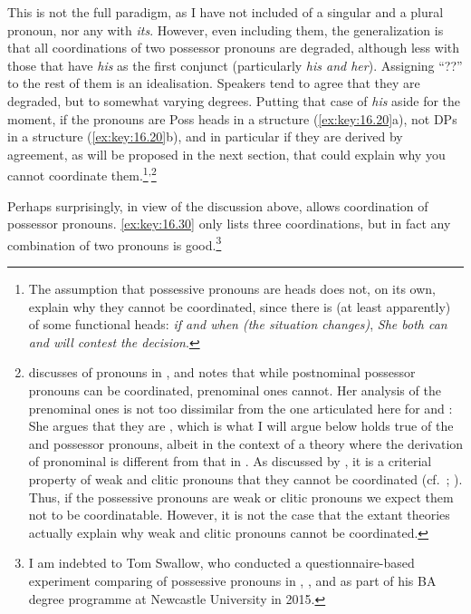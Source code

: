 \documentclass[output=paper]{langsci/langscibook}
\begin{document}
This is not the full paradigm, as I have not included  of a
singular and a plural pronoun, nor any  with \emph{its}. However,
even including them, the generalization is that all coordinations of two
possessor pronouns are degraded, although less with those that have \emph{his}
as the first conjunct (particularly \emph{his and her}). Assigning \enquote{??}
to the rest of them is an idealisation. Speakers tend to agree that they are
degraded, but to somewhat varying degrees. Putting that case of \emph{his}
aside for the moment, if the pronouns are Poss heads in a structure
(\ref{ex:key:16.20}a), not DPs in a structure (\ref{ex:key:16.20}b), and in
particular if they are derived by agreement, as will be proposed in the next
section, that could explain why you cannot coordinate them.\footnote{The
    assumption that possessive pronouns are heads does not, on its own, explain
    why they cannot be coordinated, since there is (at least apparently)
     of some functional heads: \emph{if and when (the situation
    changes)}, \emph{She both can and will contest the
    decision}.}\textsuperscript{,}\footnote{\citet{Cardinaletti1998} discusses  of pronouns in
        , and notes that while postnominal possessor pronouns can be
        coordinated, prenominal ones cannot. Her analysis of the prenominal
        ones is not too dissimilar from the one articulated here for 
        and : She argues that they are , which is what I will
        argue below holds true of the  and  possessor pronouns,
        albeit in the context of a theory \citep{Roberts2010} where the
        derivation of pronominal  is different from that in
        \citet{Cardinaletti1998}. As discussed by \citet{CarSta1999}, it is a
        criterial property of weak and clitic pronouns that they cannot be
        coordinated (cf.\ \citealt{Kayne1975};
        \citealt[228--233]{Holmberg1986}). Thus, if the  possessive
        pronouns are weak or clitic pronouns we expect them not to be
        coordinatable. However, it is not the case that the extant theories
    actually explain why weak and clitic pronouns cannot be coordinated.}

Perhaps surprisingly, in view of the discussion above,  allows
coordination of possessor pronouns. \eqref{ex:key:16.30} only lists three coordinations, but in
fact any combination of two pronouns is good.\footnote{I am indebted to Tom
    Swallow, who conducted a questionnaire-based experiment comparing
     of possessive pronouns in , , and  as part
of his BA degree programme at Newcastle University in 2015.}
\end{document}

